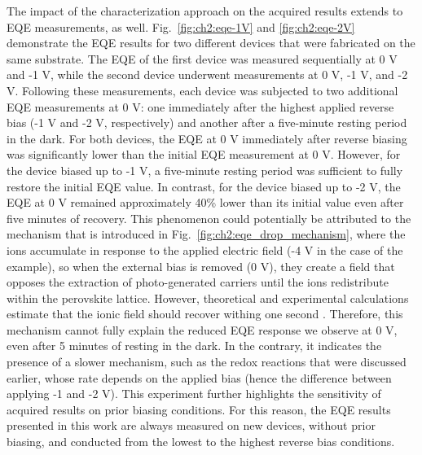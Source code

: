 The impact of the characterization approach on the acquired results extends to EQE measurements, as well. Fig.~\ref{fig:ch2:eqe-1V} and \ref{fig:ch2:eqe-2V} demonstrate the EQE results for two different devices that were fabricated on the same substrate. The EQE of the first device was measured sequentially at 0 V and -1 V, while the second device underwent measurements at 0 V, -1 V, and -2 V. Following these measurements, each device was subjected to two additional EQE measurements at 0 V: one immediately after the highest applied reverse bias (-1 V and -2 V, respectively) and another after a five-minute resting period in the dark. For both devices, the EQE at 0 V immediately after reverse biasing was significantly lower than the initial EQE measurement at 0 V. However, for the device biased up to -1 V, a five-minute resting period was sufficient to fully restore the initial EQE value. In contrast, for the device biased up to -2 V, the EQE at 0 V remained approximately 40\% lower than its initial value even after five minutes of recovery. This phenomenon could potentially be attributed to the mechanism that is introduced in Fig.~\ref{fig:ch2:eqe_drop_mechanism}, where the ions accumulate in response to the applied electric field (-4 V in the case of the example), so when the external bias is removed (0 V), they create a field that opposes the extraction of photo-generated carriers until the ions redistribute within the perovskite lattice. However, theoretical and experimental calculations estimate that the ionic field should recover withing one second \cite{Bowring2018ReverseCells}. Therefore, this mechanism cannot fully explain the reduced EQE response we observe at 0 V, even after 5 minutes of resting in the dark. In the contrary, it indicates the presence of a slower mechanism, such as the redox reactions that were discussed earlier, whose rate depends on the applied bias (hence the difference between applying -1 and -2 V). This experiment further highlights the sensitivity of acquired results on prior biasing conditions. For this reason, the EQE results presented in this work are always measured on new devices, without prior biasing, and conducted from the lowest to the highest reverse bias conditions.


